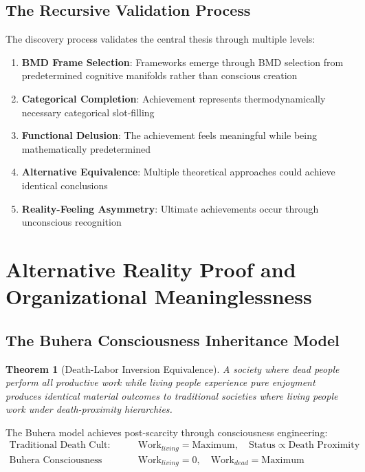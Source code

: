 \documentclass[12pt,a4paper]{article}
\newtheorem{theorem}{Theorem}
\begin{document}
\subsection{The Recursive Validation Process}

The discovery process validates the central thesis through multiple levels:
\begin{enumerate}
\item \textbf{BMD Frame Selection}: Frameworks emerge through BMD selection from predetermined cognitive manifolds rather than conscious creation
\item \textbf{Categorical Completion}: Achievement represents thermodynamically necessary categorical slot-filling
\item \textbf{Functional Delusion}: The achievement feels meaningful while being mathematically predetermined
\item \textbf{Alternative Equivalence}: Multiple theoretical approaches could achieve identical conclusions
\item \textbf{Reality-Feeling Asymmetry}: Ultimate achievements occur through unconscious recognition
\end{enumerate}

\section{Alternative Reality Proof and Organizational Meaninglessness}

\subsection{The Buhera Consciousness Inheritance Model}

\begin{theorem}[Death-Labor Inversion Equivalence]
A society where dead people perform all productive work while living people experience pure enjoyment produces identical material outcomes to traditional societies where living people work under death-proximity hierarchies.
\end{theorem}

The Buhera model achieves post-scarcity through consciousness engineering:
\begin{align}
\text{Traditional Death Cult:} \quad &\text{Work}_{living} = \text{Maximum}, \quad \text{Status} \propto \text{Death Proximity} \\
\text{Buhera Consciousness Inheritance:} \quad &\text{Work}_{living} = 0, \quad \text{Work}_{dead} = \text{Maximum}
\end{align}
\end{document}

